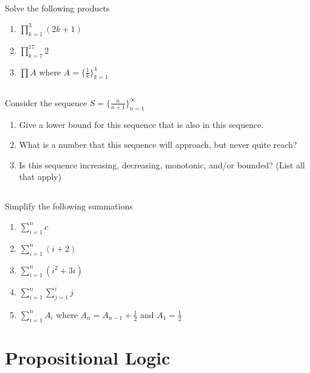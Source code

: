 \documentclass[twocolumn]{article}
\newcommand\mrk[1]{}
\begin{document}
\subsection{}

    Solve the following products

    \begin{enumerate}
        \item $ \prod_{k=1}^{3} (2k + 1) $ \mrk{1}
        \item $ \prod_{k=7}^{17} 2 $ \mrk{1}
        \item $ \prod A $ where $ A = \{ \frac{1}{k} \}^{4}_{k=1} $ \mrk{1}
    \end{enumerate}

\subsection{}

    Consider the sequence $S = \{ \frac{n}{n+1} \}^\infty_{n=1} $

    \begin{enumerate}
        \item Give a lower bound for this sequence that is also in this sequence. \mrk{1}
        \item What is a number that this sequence will approach, but never quite reach? \mrk{1}
        \item Is this sequence increasing, decreasing, monotonic, and/or bounded? (List all that apply) \mrk{1}
    \end{enumerate}

\subsection{}

Simplify the following summations

\begin{enumerate}
    \item $ \sum_{i=1}^{n} c $ \mrk{1}
    \item $ \sum_{i=1}^{n} ( i + 2 ) $ \mrk{1}
    \item $ \sum_{i=1}^{n} ( i^2 + 3i ) $ \mrk{1}
    \item $ \sum_{i=1}^{n} \sum_{j=1}^{i} j $ \mrk{1}
    \item $ \sum_{i=1}^{n} A_i $ where $ A_n = A_{n-1} + \frac{1}{2} $ and $ A_1 = \frac{1}{2} $ \mrk{1}
\end{enumerate}


\clearpage
\section{Propositional Logic}
\end{document}
